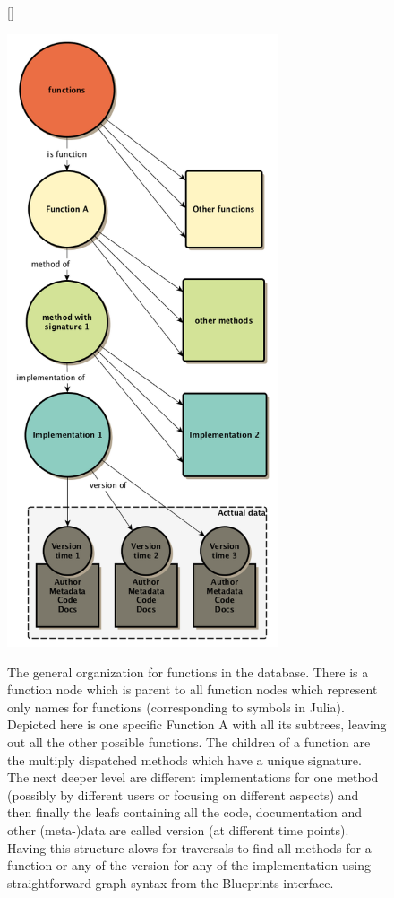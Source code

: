 \documentclass[twoside, 11pt]{scrartcl}
\begin{document}
\begin{figure}[h!]		
	[\FBwidth]
	{\caption{The general organization for functions in the database. There is a function node which is parent to all function nodes which represent only names for functions (corresponding to symbols in Julia). Depicted here is one specific Function A with all its subtrees, leaving out all the other possible functions. The children of a function are the multiply dispatched methods which have a unique signature. The next deeper level are different implementations for one method (possibly by different users or focusing on different aspects) and then finally the leafs containing all the code, documentation and other (meta-)data are called version (at different time points). Having this structure alows for traversals to find all methods for a function or any of the version for any of the implementation using straightforward graph-syntax from the Blueprints interface.}\label{fig:dbStructure1}}
	{\includegraphics[width=8cm]{figures/dbStructure1}}
\end{figure}
\end{document}
